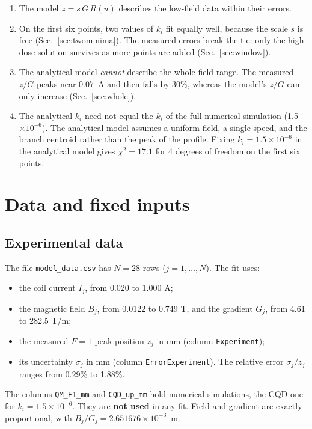 \documentclass[11pt,a4paper]{article}
\newcommand{\kan}{k_i}
\begin{document}
\begin{enumerate}
\item The model $z = s\,G\,R(u)$ describes the low-field data within their errors.
\item On the first six points, two values of $\kan$ fit equally well, because the scale $s$ is free (Sec.~\ref{sec:twominima}). The measured errors break the tie: only the high-dose solution survives as more points are added (Sec.~\ref{sec:window}).
\item The analytical model \emph{cannot} describe the whole field range. The measured $z/G$ peaks near $0.07$~A and then falls by 30\%, whereas the model's $z/G$ can only increase (Sec.~\ref{sec:whole}).
\item The analytical $\kan$ need not equal the $\kan$ of the full numerical simulation (1.5$\times10^{-6}$). The analytical model assumes a uniform field, a single speed, and the branch centroid rather than the peak of the profile. Fixing $\kan = 1.5\times10^{-6}$ in the analytical model gives $\chi^2 = 17.1$ for 4 degrees of freedom on the first six points.
\end{enumerate}

\section{Data and fixed inputs}

\subsection{Experimental data}
The file \texttt{model\_data.csv} has $N=28$ rows ($j = 1,\dots,N$). The fit uses:
\begin{itemize}
\item the coil current $I_j$, from 0.020 to 1.000 A;
\item the magnetic field $B_j$, from 0.0122 to 0.749 T, and the gradient $G_j$, from 4.61 to 282.5 T/m;
\item the measured $F=1$ peak position $z_j$ in mm (column \texttt{Experiment});
\item its uncertainty $\sigma_j$ in mm (column \texttt{ErrorExperiment}). The relative error $\sigma_j/z_j$ ranges from 0.29\% to 1.88\%.
\end{itemize}
The columns \texttt{QM\_F1\_mm} and \texttt{CQD\_up\_mm} hold numerical simulations, the CQD one for $k_i=1.5\times10^{-6}$. They are \textbf{not used} in any fit. Field and gradient are exactly proportional, with $B_j/G_j = 2.651676\times10^{-3}$~m.
\end{document}
